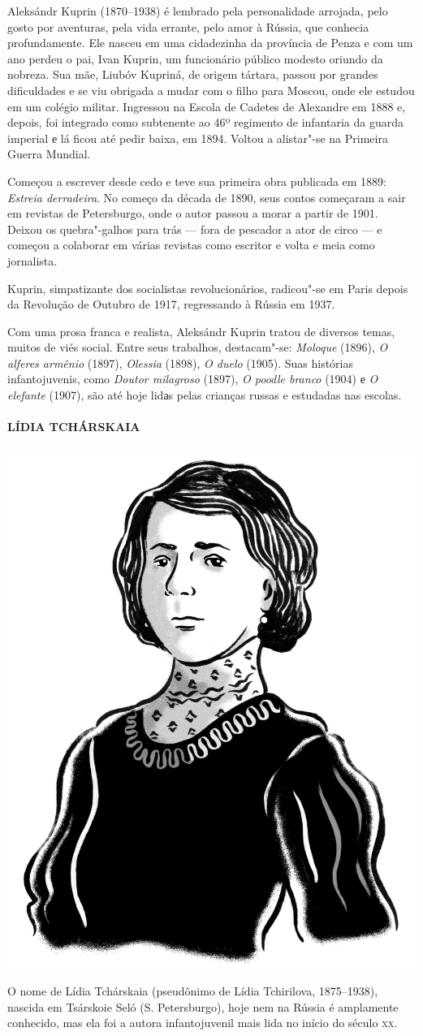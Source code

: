 {\noindent{}Aleksándr Kuprin (1870--1938) é lembrado pela personalidade arrojada,
pelo gosto por aventuras, pela vida errante, pelo amor à Rússia, que
conhecia profundamente. Ele nasceu em uma cidadezinha da província de
Penza e com um ano perdeu o pai, Ivan Kuprin, um
funcionário público modesto oriundo da nobreza. Sua mãe, Liubóv Kupriná, de origem tártara, passou por grandes dificuldades e se
viu obrigada a mudar com o filho para Moscou, onde ele estudou em um
colégio militar. Ingressou na Escola de Cadetes de Alexandre em 1888 e,
depois, foi integrado como subtenente ao 46º regimento de infantaria da
guarda imperial е lá ficou até pedir baixa, em 1894. Voltou a alistar"-se
na Primeira Guerra Mundial.

Começou a escrever desde cedo e teve sua primeira obra publicada em
1889: \emph{Estreia derradeira}. No começo da década de 1890, seus
contos começaram a sair em revistas de Petersburgo, onde o autor passou
a morar a partir de 1901. Deixou os quebra"-galhos para trás --- fora de pescador
a ator de circo --- e começou a colaborar em várias revistas como
escritor e volta e meia como jornalista.

Kuprin, simpatizante dos socialistas revolucionários, radicou"-se em
Paris depois da Revolução de Outubro de 1917, regressando à Rússia em
1937.

Com uma prosa franca e realista, Aleksándr Kuprin tratou de diversos
temas, muitos de viés social. Entre seus trabalhos, destacam"-se:
\emph{Moloque} (1896), \emph{O alferes armênio} (1897), \emph{Olessia}
(1898), \emph{O duelo} (1905). Suas histórias infantojuvenis, como
\emph{Doutor milagroso} (1897), \emph{O poodle branco} (1904) е \emph{O
elefante} (1907), são até hoje lidаs pelas crianças russas e estudadas
nas escolas.

\paragraph{LÍDIA TCHÁRSKAIA}

\noindent\includegraphics[width=.8in]{./imgs/autor10.jpg}

\noindent{}O nome de Lídia Tchárskaia (pseudônimo de Lídia Tchirilova, 1875--1938),
nascida em Tsárskoie Seló (S. Petersburgo), hoje nem na Rússia é
amplamente conhecido, mas ela foi a autora infantojuvenil mais lida no
início do século \textsc{xx}.

}
